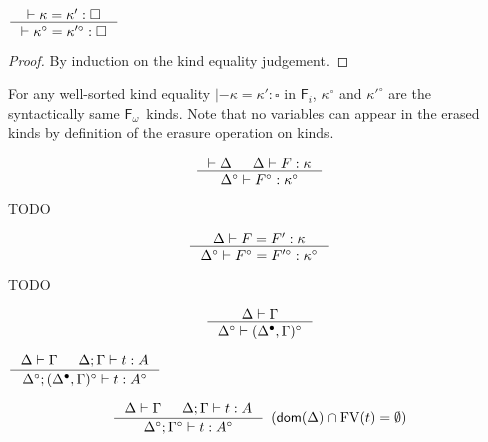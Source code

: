 \documentclass{llncs}
\newcommand{\Fi}{\ensuremath{\mathsf{F}_i}}
\newcommand{\Fw}{\ensuremath{\mathsf{F}_\omega}}
\newcommand{\dom}{\mathop{\mathsf{dom}}}
\newcommand{\FV}{\mathop{\mathrm{FV}}}
\begin{document}
\begin{theorem}\label{thm:ierasekindeq}
$ \inference{|- \kappa=\kappa':\square}
        {|- \kappa^\circ=\kappa'^\circ:\square}
$
\end{theorem}
\begin{proof}
        By induction on the kind equality judgement.
\end{proof}
\begin{remark}
For any well-sorted kind equality $|- \kappa=\kappa':\square$ in \Fi,
$\kappa^\circ$ and $\kappa'^\circ$ are the syntactically same \Fw\ kinds.
Note that no variables can appear in the erased kinds by definition of
the erasure operation on kinds.
\end{remark}

\begin{theorem}
\label{thm:ierasekinding}
\[ \inference{|- \Delta & \Delta |- F : \kappa}
                {\Delta^\circ |- F^\circ : \kappa^\circ}
\]
\end{theorem}
\begin{remark} TODO
\end{remark}


\begin{theorem}
\label{thm:ierasetyconeq}
\[ \inference{\Delta |- F=F':\kappa}
                {\Delta^\circ |- F^\circ=F'^\circ:\kappa^\circ}
\]
\end{theorem}
\begin{remark} TODO
\end{remark}

\begin{theorem}
\label{thm:ierasetmctxivs}
\[ \inference{\Delta |- \Gamma}{\Delta^\circ |- (\Delta^\bullet,\Gamma)^\circ}
\]
\end{theorem}

\begin{theorem}
\label{thm:ierasetypingall}
$ \inference{\Delta |- \Gamma & \Delta;\Gamma |- t : A}
                {\Delta^\circ;(\Delta^\bullet,\Gamma)^\circ |- t : A^\circ}
$
\end{theorem}

\begin{corollary}
\label{thm:ierasetypingifree}
\[ \inference{ \Delta |- \Gamma & \Delta;\Gamma |- t : A}
                {\Delta^\circ;\Gamma^\circ |- t : A^\circ}
                {\enspace(\dom(\Delta)\cap\FV(t) = \emptyset)}
\]
\end{corollary}
\end{document}
